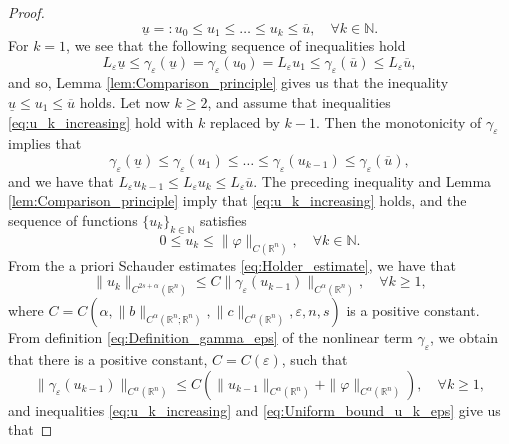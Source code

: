\documentclass[11pt,reqno]{amsart}
\theoremstyle{definition}
\theoremstyle{remark}
\begin{document}
\begin{proof}
\begin{equation}
\label{eq:u_k_increasing}
\underline u=:u_0\leq u_1\leq\ldots\leq u_k \leq \overline u,\quad\forall k \in {\mathbb{N}}.
\end{equation}
For $k=1$, we see that the following sequence of inequalities hold
$$
L_{\varepsilon} \underline u \leq \gamma_{\varepsilon}(\underline u) = \gamma_{\varepsilon}(u_0) = L_{\varepsilon} u_1 \leq \gamma_{\varepsilon}(\overline u) \leq L_{\varepsilon} \overline u,
$$
and so, Lemma \ref{lem:Comparison_principle} gives us that the inequality $\underline u\leq u_1 \leq \overline u$ holds. Let now $k\geq 2$, and assume that inequalities \eqref{eq:u_k_increasing} hold with $k$ replaced by $k-1$. Then the monotonicity of $\gamma_{\varepsilon}$ implies that 
\begin{equation*}
\gamma_{\varepsilon}(\underline u)\leq \gamma_{\varepsilon}(u_1)\leq\ldots\leq \gamma_{\varepsilon}(u_{k-1}) \leq \gamma_{\varepsilon}(\overline u),
\end{equation*}
and we have that $L_{\varepsilon} u_{k-1} \leq L_{\varepsilon} u_k \leq L_{\varepsilon} \overline u$. The preceding inequality and Lemma \ref{lem:Comparison_principle} imply that \eqref{eq:u_k_increasing} holds, and the sequence of functions $\{u_k\}_{k\in{\mathbb{N}}}$ satisfies
\begin{equation}
\label{eq:Uniform_bound_u_k_eps}
0\leq u_k\leq\|\varphi\|_{C({\mathbb{R}}^n)},\quad\forall k \in{\mathbb{N}}.
\end{equation}
From the a priori Schauder estimates \eqref{eq:Holder_estimate}, we have that  
\begin{equation}
\label{eq:Schauder_estimate_u_k_eps}
\|u_k\|_{C^{2s+\alpha}({\mathbb{R}}^n)} \leq C \|\gamma_{\varepsilon}(u_{k-1})\|_{C^{\alpha}({\mathbb{R}}^n)},\quad\forall k \geq 1,
\end{equation}
where $C=C(\alpha, \|b\|_{C^{\alpha}({\mathbb{R}}^n;{\mathbb{R}}^n)}, \|c\|_{C^{\alpha}({\mathbb{R}}^n)},{\varepsilon},n,s)$ is a positive constant. From definition \eqref{eq:Definition_gamma_eps} of the nonlinear term $\gamma_{\varepsilon}$, we obtain that there is a positive constant, $C=C({\varepsilon})$, such that
\begin{equation}
\label{eq:Holder_norm_gamma_eps}
\|\gamma_{\varepsilon}(u_{k-1})\|_{C^{\alpha}({\mathbb{R}}^n)} \leq C\left(\|u_{k-1}\|_{C^{\alpha}({\mathbb{R}}^n)} + \|\varphi\|_{C^{\alpha}({\mathbb{R}}^n)}\right),\quad\forall k \geq 1,
\end{equation}
and inequalities \eqref{eq:u_k_increasing} and \eqref{eq:Uniform_bound_u_k_eps} give us that

\end{proof}
\end{document}
